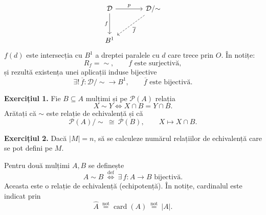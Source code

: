 \[
\begin{tikzcd}[column sep=large,row sep=large]
 \mathcal D\arrow[r,"p"]\arrow[d,"f"']
   & \mathcal D/{\sim}\arrow[dl,dashed,"\overline f"]\\
 B^1 &
\end{tikzcd}
\]
$f(d)$ este intersecția cu $B^1$ a dreptei paralele cu $d$
care trece prin $O$.
În notițe:
\[
 R_f=\sim,\qquad f\text{ este surjectivă},
\]
și rezultă existența unei aplicații induse bijective
\[
 \exists!\,\overline f:\mathcal D/{\sim}\longrightarrow B^1,
 \qquad \overline f\text{ este bijectivă}.
\]

\medskip
\noindent\textbf{Exercițiul 1.}
Fie $B\subseteq A$ mulțimi și pe $\mathcal P(A)$ relația
\[
 X\sim Y\iff X\cap B=Y\cap B.
\]
Arătați că $\sim$ este relație de echivalență și că
\[
 \mathcal P(A)/{\sim}\ \cong\ \mathcal P(B),
 \qquad X\longmapsto X\cap B.
\]

\noindent\textbf{Exercițiul 2.}
Dacă $|M|=n$, să se calculeze numărul relațiilor de echivalență
care se pot defini pe $M$.

\medskip
\noindent Pentru două mulțimi $A,B$ se definește
\[
 A\sim B\ \overset{\mathrm{def}}{\iff}\
 \exists\,f:A\longrightarrow B\text{ bijectivă}.
\]
Aceasta este o relație de echivalență (echipotență). În notițe,
cardinalul este indicat prin
\[
 \boxed{\widehat A\ \overset{\mathrm{not}}{=}
 \operatorname{card}(A)\ \overset{\mathrm{not}}{=}\ |A|}.
\]

\endgroup
